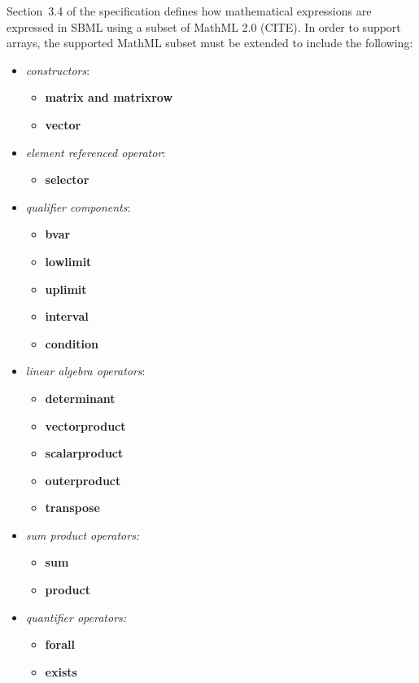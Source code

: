 Section~3.4 of the \sbmlthreecore specification defines how mathematical expressions are expressed in SBML using a subset of MathML 2.0 (CITE).  In order to support arrays, the supported MathML subset must be extended to include the following:
\begin{itemize}
\item \emph{constructors}:
  \begin{itemize}
    \item {\bf matrix and matrixrow} 
    \item {\bf vector}
  \end{itemize}
\item \emph{element referenced operator}:
  \begin{itemize}
  \item {\bf selector}
  \end{itemize}
\item \emph{qualifier components}: 
  \begin{itemize}  
  \item {\bf bvar}
  \item {\bf lowlimit}
  \item {\bf uplimit}
  \item {\bf interval}
  \item {\bf condition}
  \end{itemize}
\item \emph{linear algebra operators}:
\begin{itemize}
  \item{\bf determinant}
  \item {\bf vectorproduct}
  \item {\bf scalarproduct}
  \item {\bf outerproduct}
  \item {\bf transpose}
\end{itemize}
\item \emph{sum product operators:}
  \begin{itemize}
  \item {\bf sum}
  \item {\bf product}
  \end{itemize}
\item \emph{quantifier operators:}
\begin{itemize}
\item{\bf forall}
\item{\bf exists}
\end{itemize}
\end{itemize}

